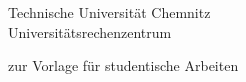 \begin{tuctitlepage}
\begin{tuctitleorgunit}
Technische Universität Chemnitz \\
Universitätsrechenzentrum \\
\end{tuctitleorgunit}

\tuctitlelogo

\bigskip
\begin{tuctitleblock}{zur}
{\LARGE Vorlage für studentische Arbeiten}
\end{tuctitleblock}
\bigskip
\renewcommand{\tuctitleauthorphrase}{von}

\vfill

\end{tuctitlepage}
